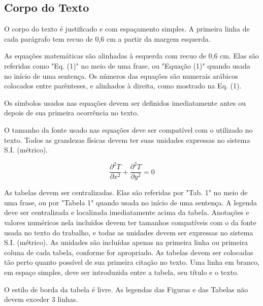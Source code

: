 \documentclass[10pt,fleqn,a4paper]{article}
\begin{document}
    \subsection{Corpo do Texto}

        O corpo do texto é justificado e com espaçamento simples. A primeira linha de cada parágrafo tem recuo de 0,6 cm a partir da margem esquerda.

        As equações matemáticas são alinhadas à esquerda com recuo de 0,6 cm.  Elas são referidas como "Eq. (1)" no meio de uma frase, ou "Equação (1)" quando usada no início de uma sentença. Os números das equações são numerais arábicos colocados entre parênteses, e alinhados à direita, como mostrado na Eq. (1).

        Os símbolos usados nas equações devem ser definidos imediatamente antes ou depois de sua primeira ocorrência no texto. \citep{artigoMangaSBAI}

        O tamanho da fonte usado nas equações deve ser compatível com o utilizado no texto. Todos as grandezas físicas devem ter suas unidades expressas no sistema S.I. (métrico).

        \begin{equation}
        \frac{\partial^2 T}{\partial x^2} + \frac{\partial^2 T}{\partial y^2} = 0 \label{equation1}
        \end{equation}

        As tabelas devem ser centralizadas. Elas são referidas por "Tab. 1" no meio de uma frase, ou por "Tabela 1" quando usada no início de uma sentença. A legenda deve ser centralizada e localizada imediatamente acima da tabela. Anotações e valores numéricos nela incluídos devem ter tamanhos compatíveis com o da fonte usada no texto do trabalho, e todas as unidades devem ser expressas no sistema S.I. (métrico). As unidades são incluídas apenas na primeira linha ou primeira coluna de cada tabela, conforme for apropriado. As tabelas devem ser colocadas tão perto quanto possível de sua primeira citação no texto. Uma linha em branco, em espaço simples, deve ser introduzida entre a tabela, seu título e o texto.

        O estilo de borda da tabela é livre. As legendas das Figuras e das Tabelas não devem exceder 3 linhas.
\end{document}
